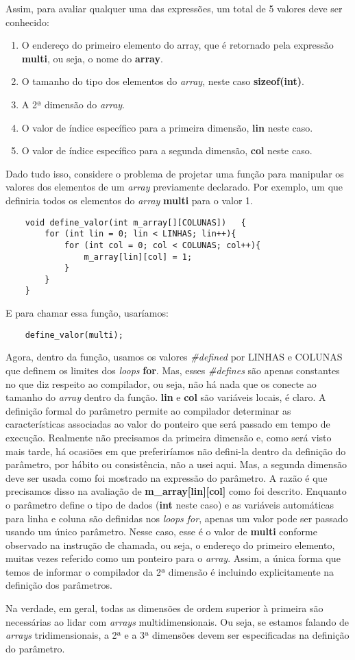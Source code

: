 Assim, para avaliar qualquer uma das expressões, um total de 5 valores deve ser conhecido:
\begin{enumerate}
	\item O endereço do primeiro elemento do array, que é retornado pela expressão \textbf{multi}, ou seja, o nome do \textbf{array}.
	\item O tamanho do tipo dos elementos do \textit{array}, neste caso \textbf{sizeof(int)}.
	\item A 2ª dimensão do \textit{array}.
	\item O valor de índice específico para a primeira dimensão, \textbf{lin} neste caso.
	\item O valor de índice específico para a segunda dimensão, \textbf{col} neste caso.
\end{enumerate}

Dado tudo isso, considere o problema de projetar uma função para manipular os valores dos elementos de um \textit{array} previamente declarado. Por exemplo, um que definiria todos os elementos do \textit{array} \textbf{multi} para o valor 1.

\begin{lstlisting}
	void define_valor(int m_array[][COLUNAS])	{
		for (int lin = 0; lin < LINHAS; lin++){
			for (int col = 0; col < COLUNAS; col++){
				m_array[lin][col] = 1;
			}
		}
	}
\end{lstlisting}

E para chamar essa função, usaríamos:
\begin{lstlisting}
	define_valor(multi);
\end{lstlisting}

Agora, dentro da função, usamos os valores \textit{\#defined} por LINHAS e COLUNAS que definem os limites dos \textit{loops} \textbf{for}. Mas, esses \textit{\#defines} são apenas constantes no que diz respeito ao compilador, ou seja, não há nada que os conecte ao tamanho do \textit{array} dentro da função. \textbf{lin} e \textbf{col} são variáveis locais, é claro. A definição formal do parâmetro permite ao compilador determinar as   características associadas ao valor do ponteiro que será passado em tempo de execução. Realmente não precisamos da primeira dimensão e, como será visto mais tarde, há ocasiões em que preferiríamos não defini-la dentro da definição do parâmetro, por hábito ou consistência, não a usei aqui. Mas, a segunda dimensão deve ser usada como foi mostrado na expressão do parâmetro. A razão é que precisamos disso na avaliação de \textbf{m\_array[lin][col]} como foi descrito. Enquanto o parâmetro define o tipo de dados (\textbf{int} neste caso) e as variáveis automáticas para linha e coluna são definidas nos \textit{loops for}, apenas um valor pode ser passado usando um único parâmetro. Nesse caso, esse é o valor de \textbf{multi} conforme observado na instrução de chamada, ou seja, o endereço do primeiro elemento, muitas vezes referido como um ponteiro para o \textit{array}. Assim, a única forma que temos de informar o compilador da 2ª dimensão é incluindo explicitamente na definição dos parâmetros.

Na verdade, em geral, todas as dimensões de ordem superior à primeira são necessárias ao lidar com \textit{arrays} multidimensionais. Ou seja, se estamos falando de \textit{arrays} tridimensionais, a 2ª e a 3ª dimensões devem ser especificadas na definição do parâmetro.